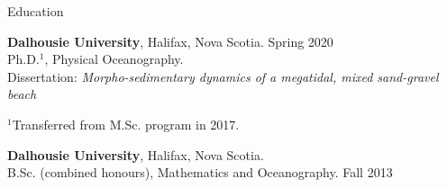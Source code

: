 \documentclass{resume} %
\begin{document}

\begin{rSection}{Education}


\textbf{Dalhousie University}, Halifax, Nova Scotia. \hfill Spring 2020 \\
Ph.D.$^{1}$, Physical Oceanography. \\
Dissertation: \textit{Morpho-sedimentary dynamics of a megatidal, mixed sand-gravel beach} \\
\begin{footnotesize}
	$^{1}$Transferred from M.Sc. program in 2017.
\end{footnotesize}


\textbf{Dalhousie University}, Halifax, Nova Scotia. \\
B.Sc. (combined honours), Mathematics and Oceanography. \hfill Fall 2013 \\

\end{rSection}

\end{document}
